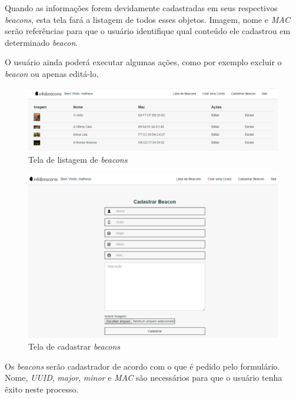 Quando as informações forem devidamente cadastradas em seus respectivos \textit{beacons}, esta tela fará a listagem de todos esses objetos. Imagem, nome e \textit{MAC} serão referências para que o usuário identifique qual conteúdo ele cadastrou em determinado \textit{beacon}. 

O usuário ainda poderá executar algumas ações, como por exemplo excluir o \textit{beacon} ou apenas editá-lo. 

\begin{figure}[H]
  \centering
  \includegraphics[width=16cm]{./figs/ListaBeacons.jpg}
  \caption{Tela de listagem de \textit{beacons}}
  \par{}
\end{figure}

\begin{figure}[H]
  \centering  
  \includegraphics[width=14cm]{./figs/CadastrarBeacon.jpg}
  \caption{Tela de cadastrar \textit{beacons}}
  \par{}
\end{figure}

Os \textit{beacons} serão cadastrador de acordo com o que é pedido pelo formulário. Nome, \textit{UUID}, \textit{major}, \textit{minor} e \textit{MAC} são necessários para que o usuário tenha êxito neste processo. 

